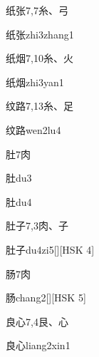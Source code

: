 \begin{entry}{纸张}{7,7}{⽷、⼸}
  \begin{phonetics}{纸张}{zhi3zhang1}
  \end{phonetics}
\end{entry}

\begin{entry}{纸烟}{7,10}{⽷、⽕}
  \begin{phonetics}{纸烟}{zhi3yan1}
  \end{phonetics}
\end{entry}

\begin{entry}{纹路}{7,13}{⽷、⾜}
  \begin{phonetics}{纹路}{wen2lu4}
  \end{phonetics}
\end{entry}

\begin{entry}{肚}{7}{⾁}
  \begin{phonetics}{肚}{du3}
  \end{phonetics}
  \begin{phonetics}{肚}{du4}
  \end{phonetics}
\end{entry}

\begin{entry}{肚子}{7,3}{⾁、⼦}
  \begin{phonetics}{肚子}{du4zi5}[][HSK 4]
  \end{phonetics}
\end{entry}

\begin{entry}{肠}{7}{⾁}
  \begin{phonetics}{肠}{chang2}[][HSK 5]
  \end{phonetics}
\end{entry}

\begin{entry}{良心}{7,4}{⾉、⼼}
  \begin{phonetics}{良心}{liang2xin1}
  \end{phonetics}
\end{entry}

